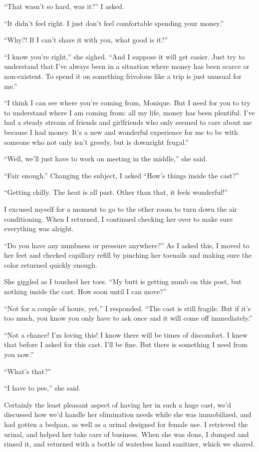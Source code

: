 ``That wasn't so hard, was it?'' I asked.

``It didn't feel right. I just don't feel comfortable spending your money.''

``Why?! If I can't share it with you, what good is it?''

``I know you're right,'' she sighed. ``And I suppose it will get easier. Just try to
understand that I've always been in a situation where money has been scarce or non-existent. To
spend it on something frivolous like a trip is just unusual for me.''

``I think I can see where you're coming from, Monique. But I need for you to try to
understand where I am coming from: all my life, money has been plentiful. I've had a steady
stream of friends and girlfriends who only seemed to care about me because I had money. It's a
new and wonderful experience for me to be with someone who not only isn't greedy, but is
downright frugal.''

``Well, we'll just have to work on meeting in the middle,'' she said.

``Fair enough.'' Changing the subject, I asked ``How's things inside the cast?''

``Getting chilly. The heat is all past. Other than that, it feels wonderful!''

I excused myself for a moment to go to the other room to turn down the air conditioning.
When I returned, I continued checking her over to make sure everything was alright.

``Do you have any numbness or pressure anywhere?'' As I asked this, I moved to her feet and
checked capillary refill by pinching her toenails and making sure the color returned quickly
enough.

She giggled as I touched her toes. ``My butt is getting numb on this post, but nothing
inside the cast. How soon until I can move?''

``Not for a couple of hours, yet,'' I responded. ``The cast is still fragile. But if it's too
much, you know you only have to ask once and it will come off immediately.''

``Not a chance! I'm loving this! I know there will be times of discomfort. I knew that
before I asked for this cast. I'll be fine. But there is something I need from you now.''

``What's that?''

``I have to pee,'' she said.

Certainly the least pleasant aspect of having her in such a huge cast, we'd discussed how
we'd handle her elimination needs while she was immobilized, and had gotten a bedpan, as well as
a urinal designed for female use. I retrieved the urinal, and helped her take care of business.
When she was done, I dumped and rinsed it, and returned with a bottle of waterless hand
sanitizer, which we shared.

